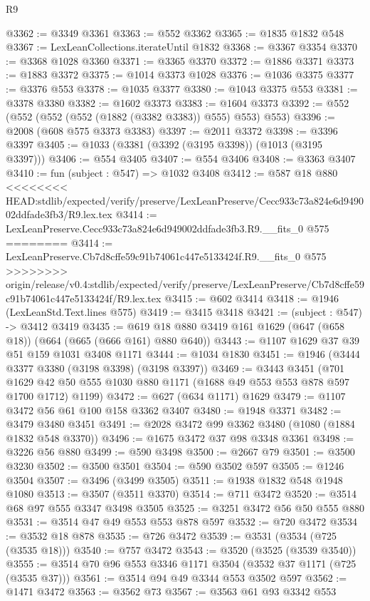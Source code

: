 \begin{lexlean}{R9}
\begin{coremodule}
{{{{{{{{{{{{{{{{{{{{{@3362 := @3349 @3361
@3363 := @552 @3362
@3365 := @1835 @1832 @548
@3367 := LexLeanCollections.iterateUntil @1832
@3368 := @3367 @3354
@3370 := @3368 @1028 @3360
@3371 := @3365 @3370
@3372 := @1886 @3371
@3373 := @1883 @3372
@3375 := @1014 @3373 @1028
@3376 := @1036 @3375
@3377 := @3376 @553
@3378 := @1035 @3377
@3380 := @1043 @3375 @553
@3381 := @3378 @3380
@3382 := @1602 @3373
@3383 := @1604 @3373
@3392 := @552 (@552 (@552 (@552 (@1882 (@3382 @3383)) @555) @553) @553)
@3396 := @2008 (@608 @575 @3373 @3383)
@3397 := @2011 @3372
@3398 := @3396 @3397
@3405 := @1033 (@3381 (@3392 (@3195 @3398)) (@1013 (@3195 @3397)))
@3406 := @554 @3405
@3407 := @554 @3406
@3408 := @3363 @3407
@3410 := fun (subject : @547) => @1032 @3408
@3412 := @587 @18 @880
<<<<<<<< HEAD:stdlib/expected/verify/preserve/LexLeanPreserve/Cecc933c73a824e6d949002ddfade3fb3/R9.lex.tex
@3414 := LexLeanPreserve.Cecc933c73a824e6d949002ddfade3fb3.R9.__fits_0 @575
========
@3414 := LexLeanPreserve.Cb7d8cffe59c91b74061c447e5133424f.R9.__fits_0 @575
>>>>>>>> origin/release/v0.4:stdlib/expected/verify/preserve/LexLeanPreserve/Cb7d8cffe59c91b74061c447e5133424f/R9.lex.tex
@3415 := @602 @3414
@3418 := @1946 (LexLeanStd.Text.lines @575)
@3419 := @3415 @3418
@3421 := (subject : @547) -> @3412 @3419
@3435 := @619 @18 @880 @3419 @161 @1629 (@647 (@658 @18)) (@664 (@665 (@666 @161) @880 @640))
@3443 := @1107 @1629 @37 @39 @51 @159 @1031 @3408 @1171
@3444 := @1034 @1830
@3451 := @1946 (@3444 @3377 @3380 (@3198 @3398) (@3198 @3397))
@3469 := @3443
    @3451
    (@701 @1629 @42 @50 @555 @1030 @880 @1171 (@1688 @49 @553 @553 @878 @597 @1700 @1712) @1199)
@3472 := @627 (@634 @1171) @1629
@3479 := @1107 @3472 @56 @61 @100 @158 @3362 @3407
@3480 := @1948 @3371
@3482 := @3479 @3480 @3451
@3491 := @2028 @3472 @99 @3362 @3480 (@1080 (@1884 @1832 @548 @3370))
@3496 := @1675 @3472 @37 @98 @3348 @3361
@3498 := @3226 @56 @880
@3499 := @590 @3498
@3500 := @2667 @79
@3501 := @3500 @3230
@3502 := @3500 @3501
@3504 := @590 @3502 @597
@3505 := @1246 @3504
@3507 := @3496 (@3499 @3505)
@3511 := @1938 @1832 @548 @1948 @1080
@3513 := @3507 (@3511 @3370)
@3514 := @711 @3472
@3520 := @3514 @68 @97 @555 @3347 @3498 @3505
@3525 := @3251 @3472 @56 @50 @555 @880
@3531 := @3514 @47 @49 @553 @553 @878 @597
@3532 := @720 @3472
@3534 := @3532 @18 @878
@3535 := @726 @3472
@3539 := @3531 (@3534 (@725 (@3535 @18)))
@3540 := @757 @3472
@3543 := @3520 (@3525 (@3539 @3540))
@3555 := @3514 @70 @96 @553 @3346 @1171 @3504 (@3532 @37 @1171 (@725 (@3535 @37)))
@3561 := @3514 @94 @49 @3344 @553 @3502 @597
@3562 := @1471 @3472
@3563 := @3562 @73
@3567 := @3563 @61 @93 @3342 @553
}}}}}}}}}}}}}}}}}}}}}
\end{coremodule}
\end{lexlean}
